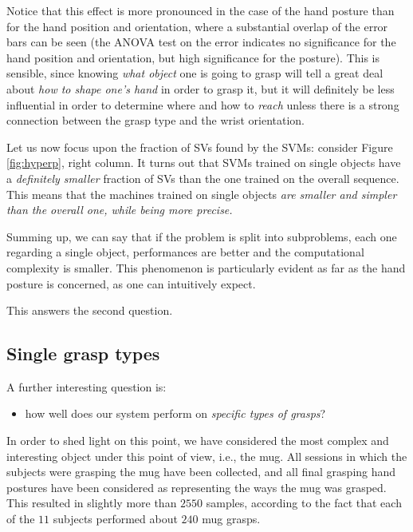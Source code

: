Notice that this effect is more pronounced in the case of the hand
posture than for the hand position and orientation, where a
substantial overlap of the error bars can be seen (the ANOVA test on
the error indicates no significance for the hand position and
orientation, but high significance for the posture). This is sensible,
since knowing \emph{what object} one is going to grasp will tell a
great deal about \emph{how to shape one's hand} in order to grasp it,
but it will definitely be less influential in order to determine where
and how to \emph{reach} unless there is a strong connection between
the grasp type and the wrist orientation.

Let us now focus upon the fraction of SVs found by the SVMs: consider
Figure \ref{fig:hyperp}, right column. It turns out that SVMs trained
on single objects have a \emph{definitely smaller} fraction of SVs
than the one trained on the overall sequence. This means that the
machines trained on single objects \emph{are smaller and simpler than
the overall one, while being more precise.}

Summing up, we can say that if the problem is split into subproblems,
each one regarding a single object, performances are better and the
computational complexity is smaller. This phenomenon is particularly
evident as far as the hand posture is concerned, as one can
intuitively expect.

This answers the second question.

\subsection{Single grasp types}

A further interesting question is:

\begin{itemize}

  \item how well does our system perform on \emph{specific types of
    grasps}?

\end{itemize}

In order to shed light on this point, we have considered the most
complex and interesting object under this point of view, i.e., the
mug. All sessions in which the subjects were grasping the mug have
been collected, and all final grasping hand postures have been
considered as representing the ways the mug was grasped. This resulted
in slightly more than $2550$ samples, according to the fact that each
of the $11$ subjects performed about $240$ mug grasps.

